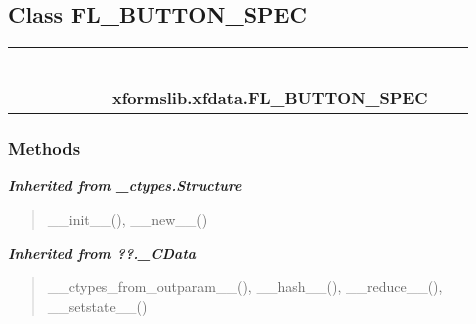 
\subsection{Class FL\_BUTTON\_SPEC}

    \label{xformslib:xfdata:FL_BUTTON_SPEC}
\begin{tabular}{cccccccccc}
\multicolumn{2}{r}{\settowidth{\BCL}{object}\multirow{2}{\BCL}{object}}
&&
&&
&&
  \\\cline{3-3}
  &&\multicolumn{1}{c|}{}
&&
&&
&&
  \\
\multicolumn{4}{r}{\settowidth{\BCL}{??.\_CData}\multirow{2}{\BCL}{??.\_CData}}
&&
&&
  \\\cline{5-5}
  &&&&\multicolumn{1}{c|}{}
&&
&&
  \\
\multicolumn{6}{r}{\settowidth{\BCL}{\_ctypes.Structure}\multirow{2}{\BCL}{\_ctypes.Structure}}
&&
  \\\cline{7-7}
  &&&&&&\multicolumn{1}{c|}{}
&&
  \\
&&&&&&\multicolumn{2}{l}{\textbf{xformslib.xfdata.FL\_BUTTON\_SPEC}}
\end{tabular}



  \subsubsection{Methods}


\large{\textbf{\textit{Inherited from \_ctypes.Structure}}}

\begin{quote}
\_\_init\_\_(), \_\_new\_\_()
\end{quote}

\large{\textbf{\textit{Inherited from ??.\_CData}}}

\begin{quote}
\_\_ctypes\_from\_outparam\_\_(), \_\_hash\_\_(), \_\_reduce\_\_(), \_\_setstate\_\_()
\end{quote}

